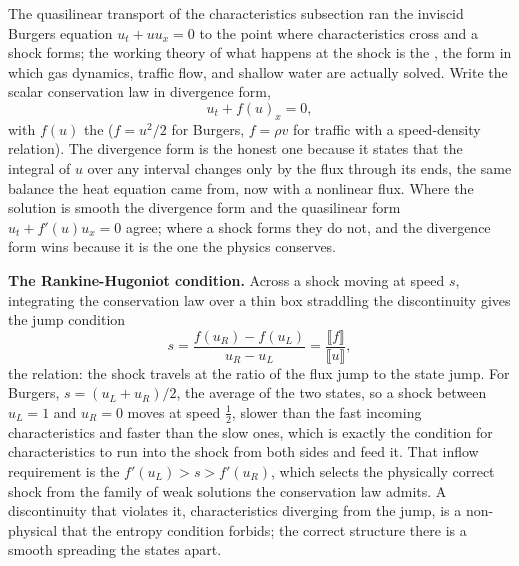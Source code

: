 \begin{mastery}
The quasilinear transport of the characteristics subsection ran the
inviscid Burgers equation $u_{t} + u u_{x} = 0$ to the point where
characteristics cross and a shock forms; the working theory of what
happens at the shock is the , the form in
which gas dynamics, traffic flow, and shallow water are actually
solved. Write the scalar conservation law in divergence form,
\[
u_{t} + f(u)_{x} = 0,
\]
with $f(u)$ the  ($f = u^{2}/2$ for Burgers,
$f = \rho v$ for traffic with a speed-density relation). The
divergence form is the honest one because it states that the
integral of $u$ over any interval changes only by the flux through
its ends, the same balance the heat equation came from, now with a
nonlinear flux. Where the solution is smooth the divergence form and
the quasilinear form $u_{t} + f'(u)u_{x} = 0$ agree; where a shock
forms they do not, and the divergence form wins because it is the one
the physics conserves.

\textbf{The Rankine-Hugoniot condition.} Across a shock moving at
speed $s$, integrating the conservation law over a thin box
straddling the discontinuity gives the jump condition
\[
s = \frac{f(u_{R}) - f(u_{L})}{u_{R} - u_{L}}
  = \frac{\llbracket f \rrbracket}{\llbracket u \rrbracket},
\]
the  relation: the shock travels at the
ratio of the flux jump to the state jump. For Burgers, $s =
(u_{L} + u_{R})/2$, the average of the two states, so a shock between
$u_{L} = 1$ and $u_{R} = 0$ moves at speed $\tfrac{1}{2}$, slower
than the fast incoming characteristics and faster than the slow
ones, which is exactly the condition for characteristics to run into
the shock from both sides and feed it. That inflow requirement is
the  $f'(u_{L}) > s > f'(u_{R})$,
which selects the physically correct shock from the family of weak
solutions the conservation law admits. A discontinuity that violates
it, characteristics diverging from the jump, is a non-physical
 that the entropy condition forbids; the
correct structure there is a smooth 
spreading the states apart.


\end{mastery}
